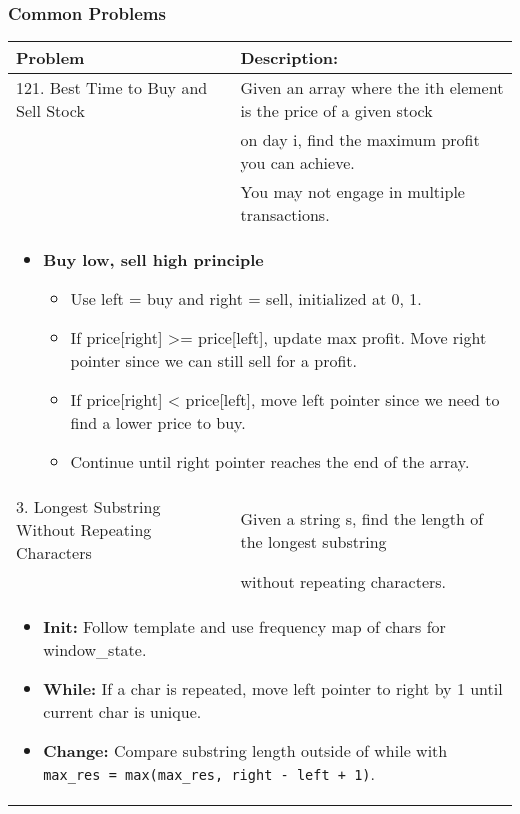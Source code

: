 \subsubsection{Common Problems}
\begin{summary}
    \begin{center}
        \begin{tabular}{ll}
            \toprule
            \textbf{Problem} & \textbf{Description:} \\
            \midrule
            121. Best Time to Buy and Sell Stock & Given an array where the ith element is the price of a given stock \\ 
            & on day i, find the maximum profit you can achieve. \\ 
            & You may not engage in multiple transactions. \\
            \multicolumn{2}{p{\linewidth}}{
                \begin{itemize}
                    \item \textbf{Buy low, sell high principle}
                    \begin{itemize}
                        \item Use left = buy and right = sell, initialized at 0, 1. 
                        \item If price[right] >= price[left], update max profit. Move right pointer since we can still sell for a profit.
                        \item If price[right] < price[left], move left pointer since we need to find a lower price to buy.
                        \item Continue until right pointer reaches the end of the array.
                    \end{itemize}
                \end{itemize}
            } \\
            \midrule
            3. Longest Substring Without Repeating Characters & Given a string s, find the length of the longest substring \\
            & without repeating characters. \\
            \multicolumn{2}{p{\linewidth}}{
                \begin{itemize}
                    \item \textbf{Init:} Follow template and use frequency map of chars for window\_state.
                    \item \textbf{While:} If a char is repeated, move left pointer to right by 1 until current char is unique. 
                    \item \textbf{Change:} Compare substring length outside of while with \texttt{max\_res = max(max\_res, right - left + 1)}.
                \end{itemize}
            } \\
            \bottomrule
        \end{tabular}
    \end{center}
\end{summary}